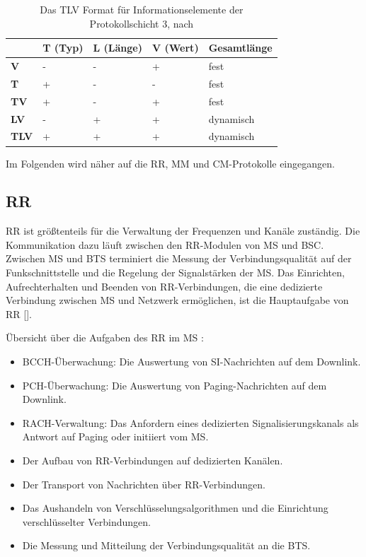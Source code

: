 \begin{table}[H]
\centering
\begin{tabular}{|l|l|l|l|l|}
\hline
             & \textbf{T (Typ)} & \textbf{L (Länge)} & \textbf{V (Wert)} & \textbf{Gesamtlänge} \\ \hline
\textbf{V}   & -                & -                  & +                 & fest                 \\ \hline
\textbf{T}   & +                & -                  & -                 & fest                 \\ \hline
\textbf{TV}  & +                & -                  & +                 & fest                 \\ \hline
\textbf{LV}  & -                & +                  & +                 & dynamisch            \\ \hline
\textbf{TLV} & +                & +                  & +                 & dynamisch            \\ \hline
\end{tabular}
\caption[Das TLV Format für Informationselemente der Protokollschicht 3]{Das \ac{TLV} Format für Informationselemente der Protokollschicht 3, nach }
\label{tab:tlv-ie}
\end{table}

Im Folgenden wird näher auf die \ac{RR}, \ac{MM} und \ac{CM}-Protokolle eingegangen. 

\subsection{\acl{RR}}
\acf{RR} ist größtenteils für die Verwaltung der Frequenzen und Kanäle zuständig. Die Kommunikation dazu läuft zwischen den \ac{RR}-Modulen von \ac{MS} und \ac{BSC}. Zwischen \ac{MS} und \ac{BTS} terminiert die Messung der Verbindungsqualität auf der Funkschnittstelle und die Regelung der Signalstärken der \ac{MS}. Das Einrichten, Aufrechterhalten und Beenden von \ac{RR}-Verbindungen, die eine dedizierte Verbindung zwischen \ac{MS} und Netzwerk ermöglichen, ist die Hauptaufgabe von \ac{RR} [].

Übersicht über die Aufgaben des \ac{RR} im \ac{MS} :
\begin{itemize}
\item \ac{BCCH}-Überwachung: Die Auswertung von \ac{SI}-Nachrichten auf dem Downlink.
\item \ac{PCH}-Überwachung: Die Auswertung von Paging-Nachrichten auf dem Downlink.
\item \ac{RACH}-Verwaltung: Das Anfordern eines dedizierten Signalisierungskanals als Antwort auf Paging oder initiiert vom \ac{MS}.
\item Der Aufbau von \ac{RR}-Verbindungen auf dedizierten Kanälen.
\item Der Transport von Nachrichten über \ac{RR}-Verbindungen.
\item Das Aushandeln von Verschlüsselungsalgorithmen und die Einrichtung verschlüsselter Verbindungen.
\item Die Messung und Mitteilung der Verbindungsqualität an die \ac{BTS}.
\end{itemize}

